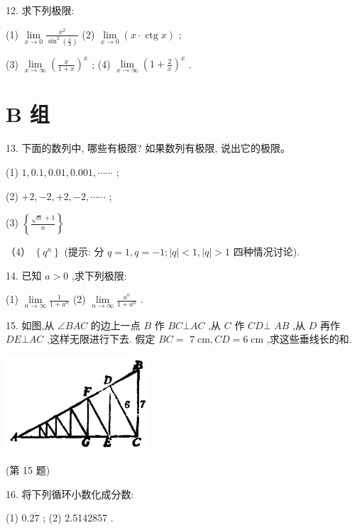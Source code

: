 \documentclass[lang=cn,newtx,10pt,scheme=chinese]{elegantbook}
\begin{document}
12. 求下列极限:

(1) \(\mathop{\lim }\limits_{{x \rightarrow 0}}\frac{{x}^{2}}{{\sin }^{2}\left( \frac{x}{3}\right) }\) (2) \(\mathop{\lim }\limits_{{x \rightarrow 0}}\left( {x \cdot \operatorname{ctg}x}\right)\) ;

(3) \(\mathop{\lim }\limits_{{x \rightarrow \infty }}{\left( \frac{x}{1 + x}\right) }^{x}\) ; (4) \(\mathop{\lim }\limits_{{x \rightarrow \infty }}{\left( 1 + \frac{2}{x}\right) }^{x}\) .

\section*{B 组}

13. 下面的数列中, 哪些有极限? 如果数列有极限, 说出它的极限。

(1) \(1,{0.1},{0.01},{0.001},\cdots \cdots\) ;

(2) \(+ 2, - 2, + 2, - 2,\cdots \cdots\) ;

(3) \(\left\{ \frac{\sqrt{n} + 1}{n}\right\}\)

（4） \(\left\{ {q}^{n}\right\}\) (提示: 分 \(q = 1,q = - 1;\left| q\right| < 1,\left| q\right| > 1\) 四种情况讨论).

14. 已知 \(a > 0\) ,求下列极限:

(1) \(\mathop{\lim }\limits_{{n \rightarrow \infty }}\frac{1}{1 + {a}^{n}}\) (2) \(\mathop{\lim }\limits_{{n \rightarrow \infty }}\frac{{a}^{n}}{1 + {a}^{n}}\) .

15. 如图,从 \(\angle {BAC}\) 的边上一点 \(B\) 作 \({BC} \bot {AC}\) ,从 \(C\) 作 \({CD} \bot\) \({AB}\) ,从 \(D\) 再作 \({DE} \bot {AC}\) ,这样无限进行下去. 假定 \({BC} =\) \(7\mathrm{\;{cm}},{CD} = 6\mathrm{\;{cm}}\) ,求这些垂线长的和.

\begin{center}
	\includegraphics[max width=0.4\textwidth]{images/01912c18-5c3f-733d-b775-749ba9897a9d_52_461588.jpg}
\end{center}

(第 15 题)

16. 将下列循环小数化成分数:

(1) \({0.2}\dot{7}\) ; (2) 2.5142857 .
\end{document}
